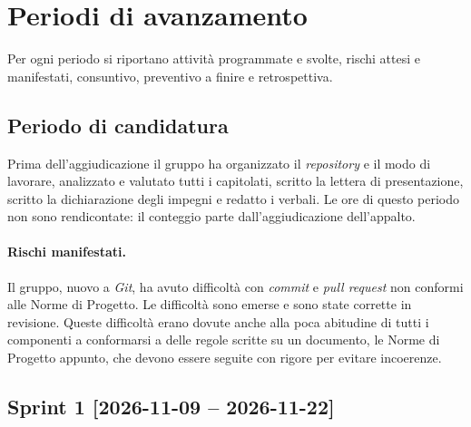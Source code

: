 \documentclass[11pt, a4paper]{article}
\begin{document}
	\newpage
	
	\section{Periodi di avanzamento}
	Per ogni periodo si riportano attività programmate e svolte, rischi attesi e manifestati, consuntivo, preventivo a finire e retrospettiva.
	
	\subsection{Periodo di candidatura}
	Prima dell'aggiudicazione il gruppo ha organizzato il \textit{repository} e il modo di lavorare, analizzato e valutato tutti i capitolati, scritto la lettera di presentazione, scritto la dichiarazione degli impegni e redatto i verbali. Le ore di questo periodo non sono rendicontate: il conteggio parte dall'aggiudicazione dell'appalto.
	
	\paragraph{Rischi manifestati.} Il gruppo, nuovo a \textit{Git}, ha avuto difficoltà con \textit{commit} e \textit{pull request} non conformi alle Norme di Progetto. Le difficoltà sono emerse e sono state corrette in revisione. Queste difficoltà erano dovute anche alla poca abitudine di tutti i componenti a conformarsi a delle regole scritte su un documento, le Norme di Progetto appunto, che devono essere seguite con rigore per evitare incoerenze.
	
	\subsection{Sprint 1 [2026-11-09 -- 2026-11-22]}
	
\end{document}
